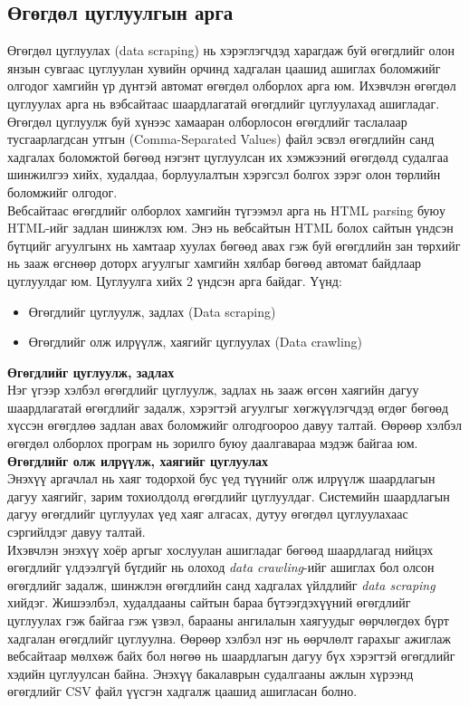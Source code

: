 \subsection{Өгөгдөл цуглуулгын арга}
Өгөгдөл цуглуулах (data scraping) нь хэрэглэгчдэд харагдаж буй өгөгдлийг олон янзын сувгаас цуглуулан хувийн орчинд хадгалан цаашид ашиглах боломжийг олгодог хамгийн үр дүнтэй автомат өгөгдөл олборлох арга юм. Ихэвчлэн өгөгдөл цуглуулах арга нь вэбсайтаас шаардлагатай өгөгдлийг цуглуулахад ашигладаг. Өгөгдөл цуглуулж буй хүнээс хамааран олборлосон өгөгдлийг таслалаар тусгаарлагдсан утгын (Comma-Separated Values) файл эсвэл өгөгдлийн санд хадгалах боломжтой бөгөөд нэгэнт цуглуулсан их хэмжээний өгөгдөлд судалгаа шинжилгээ хийх, худалдаа, борлуулалтын хэрэгсэл болгох зэрэг олон төрлийн боломжийг олгодог. 
\\ Вебсайтаас өгөгдлийг олборлох хамгийн түгээмэл арга нь HTML parsing буюу HTML-ийг задлан шинжлэх юм. Энэ нь вебсайтын HTML болох сайтын үндсэн бүтцийг агуулгынх нь хамтаар хуулах бөгөөд авах гэж буй өгөгдлийн зан төрхийг нь зааж өгснөөр доторх агуулгыг хамгийн хялбар бөгөөд автомат байдлаар цуглуулдаг юм. 
Цуглуулга хийх 2 үндсэн арга байдаг. Үүнд:
\begin{itemize}
  \item Өгөгдлийг цуглуулж, задлах (Data scraping)
  \item Өгөгдлийг олж илрүүлж, хаягийг цуглуулах (Data crawling)
\end{itemize}
\textbf{Өгөгдлийг цуглуулж, задлах}
\\Нэг үгээр хэлбэл өгөгдлийг цуглуулж, задлах нь зааж өгсөн хаягийн дагуу шаардлагатай өгөгдлийг задалж, хэрэгтэй агуулгыг хөгжүүлэгчдэд өгдөг бөгөөд хүссэн өгөгдлөө задлан авах боломжийг олгодгоороо давуу талтай. Өөрөөр хэлбэл өгөгдөл олборлох програм нь зорилго буюу даалгавараа мэдэж байгаа юм. 
\\\textbf{Өгөгдлийг олж илрүүлж, хаягийг цуглуулах}
\\Энэхүү аргачлал нь хаяг тодорхой бус үед түүнийг олж илрүүлж шаардлагын дагуу хаягийг, зарим тохиолдолд өгөгдлийг цуглуулдаг. Системийн шаардлагын дагуу өгөгдлийг цуглуулах үед хаяг алгасах, дутуу өгөгдөл цуглуулахаас сэргийлдэг давуу талтай. 
\\Ихэвчлэн энэхүү хоёр аргыг хослуулан ашигладаг бөгөөд шаардлагад нийцэх өгөгдлийг үлдээлгүй бүгдийг нь олоход \textit{data crawling}-ийг ашиглах бол олсон өгөгдлийг задалж, шинжлэн өгөгдлийн санд хадгалах үйлдлийг \textit{data scraping} хийдэг. Жишээлбэл, худалдааны сайтын бараа бүтээгдэхүүний өгөгдлийг цуглуулах гэж байгаа гэж үзвэл, барааны ангилалын хаягуудыг өөрчлөгдөх бүрт хадгалан өгөгдлийг цуглуулна. Өөрөөр хэлбэл нэг нь өөрчлөлт гарахыг ажиглаж вебсайтаар мөлхөж байх бол нөгөө нь шаардлагын дагуу бүх хэрэгтэй өгөгдлийг хэдийн цуглуулсан байна.  
Энэхүү бакалаврын судалгааны ажлын хүрээнд өгөгдлийг CSV файл үүсгэн хадгалж цаашид ашигласан болно. 
